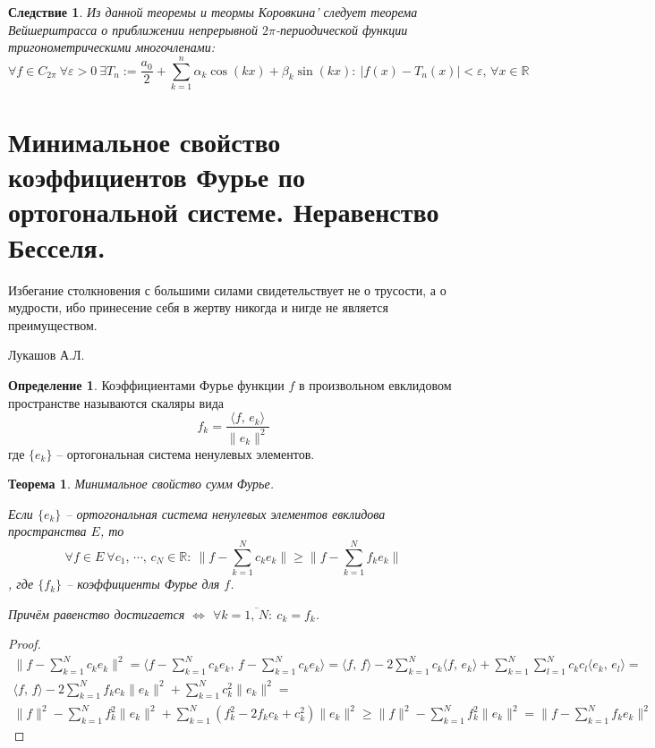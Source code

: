 \documentclass[a4paper,12pt]{article}
\renewcommand{\geq}{\ensuremath{\geqslant}}
\theoremstyle{plain}
\newtheorem{theorem}{Теорема}[section]
\newtheorem*{corollary}{Следствие}
\theoremstyle{definition}
\newtheorem{definition}{Определение}[section]
\theoremstyle{remark}
\begin{document}
\begin{corollary}
	Из данной теоремы и теормы Коровкина' следует теорема Вейшерштрасса о приближении непрерывной $2\pi$-периодической функции тригонометрическими многочленами:
	\[\forall f \in C_{2\pi} \: \forall \varepsilon > 0 \: \exists T_n := \frac{a_0}{2} + \sum_{k = 1}^n \alpha_k\cos(kx) + \beta_k\sin(kx) :\: |f(x) - T_n(x)| < \varepsilon,\, \forall x \in \mathbb{R}\]
\end{corollary}

\section{Минимальное свойство коэффициентов Фурье по ортогональной системе. Неравенство Бесселя.}

\epigraph{Избегание столкновения с большими силами свидетельствует не о трусости, а о мудрости, ибо принесение себя в жертву никогда и нигде не является преимуществом.}{Лукашов А.Л.}

\begin{definition}
	Коэффициентами Фурье функции $f$ в произвольном евклидовом пространстве называются скаляры вида
	\[f_k = \frac{\langle f,\,e_k\rangle}{\|e_k\|^2}\]
	где $\{e_k\}$ -- ортогональная система ненулевых элементов.
\end{definition}

\begin{theorem}
	Минимальное свойство сумм Фурье.

	Если $\{e_k\}$ -- ортогональная система ненулевых элементов евклидова пространства $E$, то 
	\[\forall f \in E \: \forall c_1,\,\cdots,\,c_N \in \mathbb{R}:\: \|f - \sum_{k = 1}^N c_ke_k\| \geq \|f - \sum_{k = 1}^N f_ke_k\|\], где $\{f_k\}$ -- коэффициенты Фурье для $f$. 
	
	Причём равенство достигается $\Leftrightarrow$ $\forall k = \overline{1,\,N}:\: c_k = f_k$.
\end{theorem}
\begin{proof}
	\begin{align*}
		\|f - \sum_{k=1}^N c_ke_k\|^2 = \langle f - \sum_{k = 1}^N c_ke_k,\, f - \sum_{k = 1}^N c_ke_k\rangle = \langle f,\,f\rangle - 2\sum_{k = 1}^Nc_k \langle f,\, e_k\rangle + \sum_{k = 1}^N\sum_{l = 1}^N c_kc_l \langle e_k,\, e_l \rangle = \\
		\langle f,\, f\rangle - 2\sum_{k = 1}^N f_kc_k \|e_k\|^2 + \sum_{k = 1}^Nc_k^2\|e_k\|^2 = \\
		\|f\|^2 - \sum_{k = 1}^N f_k^2\|e_k\|^2 + \sum_{k = 1}^N (f_k^2 - 2f_kc_k + c_k^2)\|e_k\|^2 \geq \|f\|^2 - \sum_{k = 1}^Nf_k^2\|e_k\|^2 = \|f - \sum_{k = 1}^N f_ke_k\|^2
	\end{align*}
\end{proof}
\end{document}
